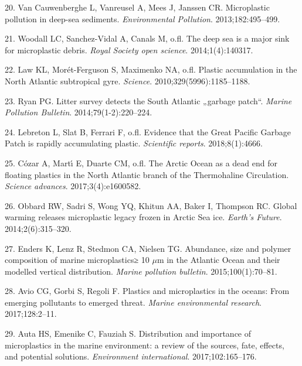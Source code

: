 \documentclass[icelandic,]{book}
\begin{document}
\leavevmode\hypertarget{ref-van2013microplastic}{}%
20. Van Cauwenberghe L, Vanreusel A, Mees J, Janssen CR. Microplastic pollution in deep-sea sediments. \emph{Environmental Pollution}. 2013;182:495--499.

\leavevmode\hypertarget{ref-woodall2014deep}{}%
21. Woodall LC, Sanchez-Vidal A, Canals M, o.fl. The deep sea is a major sink for microplastic debris. \emph{Royal Society open science}. 2014;1(4):140317.

\leavevmode\hypertarget{ref-law2010plastic}{}%
22. Law KL, Morét-Ferguson S, Maximenko NA, o.fl. Plastic accumulation in the North Atlantic subtropical gyre. \emph{Science}. 2010;329(5996):1185--1188.

\leavevmode\hypertarget{ref-ryan2014litter}{}%
23. Ryan PG. Litter survey detects the South Atlantic „garbage patch``. \emph{Marine Pollution Bulletin}. 2014;79(1-2):220--224.

\leavevmode\hypertarget{ref-lebreton2018evidence}{}%
24. Lebreton L, Slat B, Ferrari F, o.fl. Evidence that the Great Pacific Garbage Patch is rapidly accumulating plastic. \emph{Scientific reports}. 2018;8(1):4666.

\leavevmode\hypertarget{ref-cozar2017arctic}{}%
25. Cózar A, Martı́ E, Duarte CM, o.fl. The Arctic Ocean as a dead end for floating plastics in the North Atlantic branch of the Thermohaline Circulation. \emph{Science advances}. 2017;3(4):e1600582.

\leavevmode\hypertarget{ref-obbard2014global}{}%
26. Obbard RW, Sadri S, Wong YQ, Khitun AA, Baker I, Thompson RC. Global warming releases microplastic legacy frozen in Arctic Sea ice. \emph{Earth's Future}. 2014;2(6):315--320.

\leavevmode\hypertarget{ref-enders2015abundance}{}%
27. Enders K, Lenz R, Stedmon CA, Nielsen TG. Abundance, size and polymer composition of marine microplastics≥ 10 \(\mu\)m in the Atlantic Ocean and their modelled vertical distribution. \emph{Marine pollution bulletin}. 2015;100(1):70--81.

\leavevmode\hypertarget{ref-avio2017plastics}{}%
28. Avio CG, Gorbi S, Regoli F. Plastics and microplastics in the oceans: From emerging pollutants to emerged threat. \emph{Marine environmental research}. 2017;128:2--11.

\leavevmode\hypertarget{ref-auta2017distribution}{}%
29. Auta HS, Emenike C, Fauziah S. Distribution and importance of microplastics in the marine environment: a review of the sources, fate, effects, and potential solutions. \emph{Environment international}. 2017;102:165--176.
\end{document}
